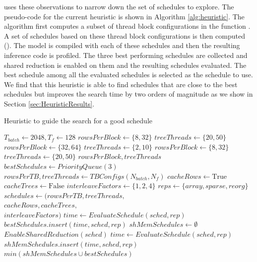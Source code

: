 \Treebeard{} uses these observations to narrow down the set of schedules to explore. 
The pseudo-code for the current heuristic is shown in Algorithm \ref{alg:heuristic}.
The algorithm first computes a subset of thread block configurations in the function 
. A set of schedules based on these thread block configurations 
is then computed (). The model is compiled with each of these schedules 
and then the resulting inference code is profiled. The three best performing schedules 
are collected and shared reduction is enabled on them and the resulting schedules evaluated.
The best schedule among all the evaluated schedules is selected as the schedule to use.
We find that this heuristic is able to find schedules that are close to the best schedules
but improves the search time by two orders of magnitude as we show in Section \ref{sec:HeuristicResults}.

\begin{algorithm}
  \caption{Heuristic to guide the search for a good schedule}
  \label{alg:heuristic}
  \begin{algorithmic}[1]
    \State $T_{batch} \gets 2048, T_f \gets 128$
      \State $rowsPerBlock \gets \{8, 32\}$
      \State $treeThreads \gets \{20, 50\}$
    \Else
        \State $rowsPerBlock \gets \{32, 64\}$
        \State $treeThreads \gets \{2, 10\}$
      \Else
        \State $rowsPerBlock \gets \{8, 32\}$
        \State $treeThreads \gets \{20, 50\}$
      \EndIf
    \EndIf
    \State \Return $rowsPerBlock, treeThreads$
  \EndProcedure
  \\
  \State $bestSchedules \gets PriorityQueue(3)$
  \State $rowsPerTB, treeThreads \gets TBConfigs(N_{batch}, N_f)$
  \State $cacheRows \gets \text{True}$
  \State $cacheTrees \gets \text{False}$
  \State $interleaveFactors \gets \{1, 2, 4\}$
  \State $reps \gets \{array, sparse, reorg\}$
  \State $schedules \gets (rowsPerTB, treeThreads,$ \\
                          \hspace{1.5cm}$cacheRows, cacheTrees,$\\ 
                          \hspace{1.5cm}$interleaveFactors)$
    \State $time \gets EvaluateSchedule(sched, rep)$
    \State $bestSchedules.insert(time, sched, rep)$
  \EndFor
  \State $shMemSchedules \gets \emptyset$
    \State $EnableSharedReduction(sched)$
    \State $time \gets EvaluateSchedule(sched, rep)$
    \State $shMemSchedules.insert(time, sched, rep)$
  \EndFor
  \State \Return $min(shMemSchedules \cup bestSchedules)$
  \end{algorithmic} 
\end{algorithm}